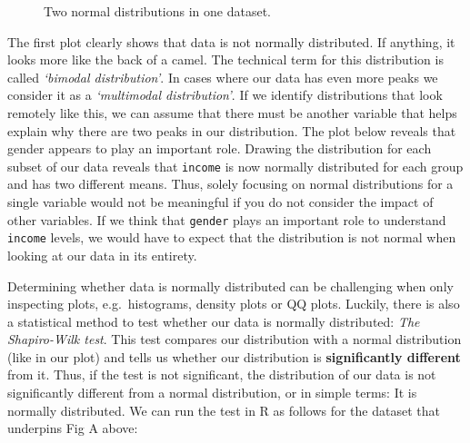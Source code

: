 \documentclass[
  letterpaper,
]{krantz}
\begin{document}
\begin{figure}


\caption{\label{fig-two-normalities-groups}Two normal distributions in
one dataset.}

\end{figure}%

The first plot clearly shows that data is not normally distributed. If
anything, it looks more like the back of a camel. The technical term for
this distribution is called \emph{`bimodal distribution'}. In cases
where our data has even more peaks we consider it as a \emph{`multimodal
distribution'}. If we identify distributions that look remotely like
this, we can assume that there must be another variable that helps
explain why there are two peaks in our distribution. The plot below
reveals that gender appears to play an important role. Drawing the
distribution for each subset of our data reveals that \texttt{income} is
now normally distributed for each group and has two different means.
Thus, solely focusing on normal distributions for a single variable
would not be meaningful if you do not consider the impact of other
variables. If we think that \texttt{gender} plays an important role to
understand \texttt{income} levels, we would have to expect that the
distribution is not normal when looking at our data in its entirety.

Determining whether data is normally distributed can be challenging when
only inspecting plots, e.g.~histograms, density plots or QQ plots.
Luckily, there is also a statistical method to test whether our data is
normally distributed: \emph{The Shapiro-Wilk test}. This test compares
our distribution with a normal distribution (like in our plot) and tells
us whether our distribution is \textbf{significantly different} from it.
Thus, if the test is not significant, the distribution of our data is
not significantly different from a normal distribution, or in simple
terms: It is normally distributed. We can run the test in R as follows
for the dataset that underpins Fig A above:
\end{document}
